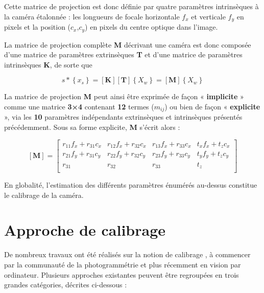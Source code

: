   Cette matrice de projection est donc définie par quatre paramètres intrinsèques à la caméra étalonnée : les longueurs de focale horizontale $f_x$ et verticale $f_y$ en pixels et la position ($c_x$,$c_y$) en pixels du centre optique dans l’image.
  
  La matrice de projection complète \textbf{M} décrivant une caméra est donc composée d’une matrice de paramètres extrinsèques \textbf{T} et d’une matrice de paramètres intrinsèques \textbf{K}, de sorte que
  
   \begin{equation}
  s
  *
  \left\{ x_s \right\}
  =
  \left[ \textbf{K} \right] 
  \left[ \textbf{T} \right]
  \left\{ X_w \right\} 
  =
  \left[ \textbf{M} \right]
  \left\{ X_w \right\} 
\end{equation}
  
  La matrice de projection \textbf{M} peut ainsi être exprimée de façon « \textbf{implicite} » comme une matrice \textbf{3×4} contenant \textbf{12} termes ($m_{ij}$) ou bien de façon « \textbf{explicite} », via les \textbf{10} paramètres indépendants extrinsèques et intrinsèques présentés précédemment. Sous sa forme explicite, \textbf{M} s’écrit alors :
  
   \begin{equation}
  \left[ \textbf{M} \right]
  =
  \left[ 
  \begin{array}{cccc}
  	r_{11}f_x + r_{31}c_x & r_{12}f_x + r_{32}c_x & r_{13}f_x + r_{33}c_x & t_xf_x + t_zc_x \\
  	r_{21}f_y + r_{31}c_y & r_{22}f_y + r_{32}c_y & r_{23}f_y + r_{33}c_y & t_yf_y + t_zc_y \\
  	r_{31} & r_{32} & r_{33} & t_z\\
  \end{array}
  \right]
\end{equation}
  
  En globalité, l'estimation des différents paramètres énumérés au-dessus constitue le calibrage de la caméra.\\
  
  \section{Approche de calibrage}
  
  De nombreux travaux ont été réalisés sur la notion de calibrage , à commencer par la communauté de la photogrammétrie et plus récemment en vision par ordinateur.
  Plusieurs approches existantes peuvent être regroupées en trois grandes catégories, décrites ci-dessous : 
  
